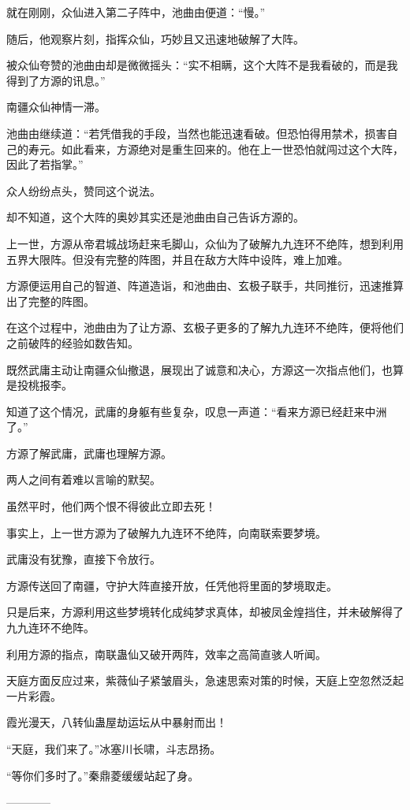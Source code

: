 \begin{this_body}
就在刚刚，众仙进入第二子阵中，池曲由便道：“慢。”

随后，他观察片刻，指挥众仙，巧妙且又迅速地破解了大阵。

被众仙夸赞的池曲由却是微微摇头：“实不相瞒，这个大阵不是我看破的，而是我得到了方源的讯息。”

南疆众仙神情一滞。

池曲由继续道：“若凭借我的手段，当然也能迅速看破。但恐怕得用禁术，损害自己的寿元。如此看来，方源绝对是重生回来的。他在上一世恐怕就闯过这个大阵，因此了若指掌。”

众人纷纷点头，赞同这个说法。

却不知道，这个大阵的奥妙其实还是池曲由自己告诉方源的。

上一世，方源从帝君城战场赶来毛脚山，众仙为了破解九九连环不绝阵，想到利用五界大限阵。但没有完整的阵图，并且在敌方大阵中设阵，难上加难。

方源便运用自己的智道、阵道造诣，和池曲由、玄极子联手，共同推衍，迅速推算出了完整的阵图。

在这个过程中，池曲由为了让方源、玄极子更多的了解九九连环不绝阵，便将他们之前破阵的经验如数告知。

既然武庸主动让南疆众仙撤退，展现出了诚意和决心，方源这一次指点他们，也算是投桃报李。

知道了这个情况，武庸的身躯有些复杂，叹息一声道：“看来方源已经赶来中洲了。”

方源了解武庸，武庸也理解方源。

两人之间有着难以言喻的默契。

虽然平时，他们两个恨不得彼此立即去死！

事实上，上一世方源为了破解九九连环不绝阵，向南联索要梦境。

武庸没有犹豫，直接下令放行。

方源传送回了南疆，守护大阵直接开放，任凭他将里面的梦境取走。

只是后来，方源利用这些梦境转化成纯梦求真体，却被凤金煌挡住，并未破解得了九九连环不绝阵。

利用方源的指点，南联蛊仙又破开两阵，效率之高简直骇人听闻。

天庭方面反应过来，紫薇仙子紧皱眉头，急速思索对策的时候，天庭上空忽然泛起一片彩霞。

霞光漫天，八转仙蛊屋劫运坛从中暴射而出！

“天庭，我们来了。”冰塞川长啸，斗志昂扬。

“等你们多时了。”秦鼎菱缓缓站起了身。

------------

\end{this_body}

